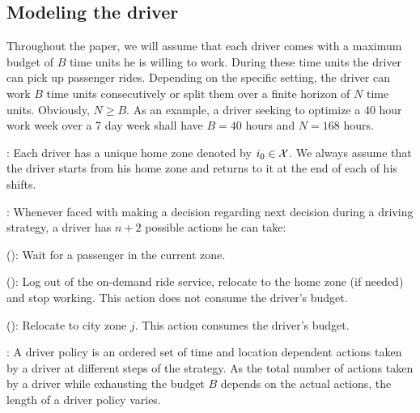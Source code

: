 \subsection{Modeling the driver}
Throughout the paper, we will assume that 
each driver comes with a 
maximum budget of $B$ time units
he is willing to work. During these time units the driver 
 can pick
up passenger rides. Depending on the specific setting, the driver can
work $B$ time units consecutively or split them 
over a finite horizon of $N$ time units. Obviously, $N \geq B$. 
As an example, a driver seeking to optimize a 40 hour work week over
a 7 day week shall have $B=40$ hours and $N=168$ hours.


: 
Each driver has a unique home zone denoted by $i_0 \in \mathcal{X}$. 
We always assume that the driver starts from his home zone and returns to it
at the end of each of his shifts.

: 
Whenever faced with making a decision regarding next decision during a driving strategy, a driver has $n+2$ possible actions he can take: 
\squishlist
	\item {\getpassenger} (\getpassengeraction): Wait for a passenger in the current zone. 
	\item {\gohome} (\gohomeaction): Log out of the on-demand ride service, relocate to the home zone (if needed) 
  and stop working.   This action does not consume the driver's budget.
	\item {\relocate} (\relocateaction): Relocate to city zone $j$.  This action consumes the driver's budget.
\squishend


:
A driver policy is an ordered set of time and location dependent actions taken by a driver at different steps of the strategy. As the total number of actions taken by a driver while exhausting the budget $B$ depends on the actual actions, the length
of a driver policy {\policy} varies. 

